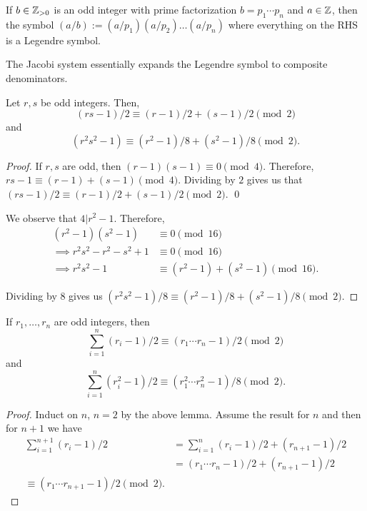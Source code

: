 \documentclass{article}
\begin{document}
\begin{definition} 
	If $b \in \mathbb Z_{>0}$ is an odd integer with prime factorization $b = p_1 \cdots p_n$ and $a \in \mathbb Z$, then the symbol $(a/b) := (a/p_1)(a/p_2)\ldots(a/p_n)$ where 
	everything on the RHS is a Legendre symbol.
\end{definition}
The Jacobi system essentially expands the Legendre symbol to composite denominators.

\begin{lemma}
	Let $r, s$ be odd integers. Then, $$(rs - 1)/ 2 \equiv (r-1)/2 + (s-1)/2 \pmod 2$$ and $$(r^2s^2 - 1) \equiv (r^2 - 1)/8 + (s^2 - 1)/ 8 \pmod 2.$$
\end{lemma}

\begin{proof}
	If $r, s$ are odd, then $(r - 1)(s - 1) \equiv 0 \pmod 4$. Therefore, $rs - 1 \equiv (r-1) + (s-1) \pmod 4$. Dividing by $2$ gives us that $(rs - 1)/2 \equiv (r - 1)/2 + (s - 1)/2 \pmod 2$. \qed

	We observe that $4 | r^2 - 1$. Therefore, 
	\begin{align*}
		(r^2 - 1)(s^2 - 1) &\equiv 0 \pmod {16} \\
		\implies r^2s^2 - r^2 - s^2 + 1 &\equiv 0 \pmod {16} \\
		\implies r^2s^2 - 1 &\equiv (r^2 - 1) + (s^2 - 1) \pmod{16}.
	\end{align*}

	Dividing by $8$ gives us $(r^2s^2 - 1)/8 \equiv (r^2 - 1)/8 + (s^2 - 1)/8 \pmod 2$.
\end{proof}

\begin{corollary}
	If $r_1, \ldots, r_n$ are odd integers, then 
	\[\sum_{i = 1}^n (r_i - 1)/2 \equiv (r_1\cdots r_n - 1)/2 \pmod 2\] and 
	\[\sum_{i = 1}^n (r_i^2 - 1)/2 \equiv (r_1^2\cdots r_n^2 - 1)/ 8 \pmod 2.\] 
\end{corollary}

\begin{proof}
	Induct on $n$, $n = 2$ by the above lemma. Assume the result for $n$ and then for $n+1$ we have 
	\begin{align*}
		\sum_{i = 1}^{n+1} (r_i - 1)/2 &= \sum_{i=1}^n (r_i - 1)/2 + (r_{n+1}-1)/2 \\
									   &= (r_1 \cdots r_n - 1)/2 + (r_{n+1}-1)/2 \\
									   \equiv (r_1 \cdots r_{n+1} - 1)/2 \pmod 2.
	\end{align*}
\end{proof}
\end{document}

